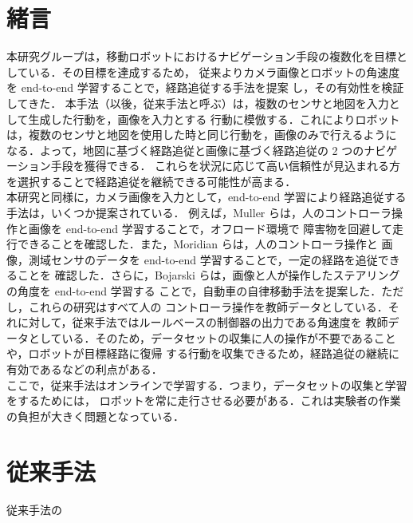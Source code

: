 \documentclass{jarticle}
\begin{document}
\date{} %

\maketitle
\thispagestyle{empty}
\pagestyle{empty}

\small
\section{緒言\protect\\}
本研究グループは，移動ロボットにおけるナビゲーション手段の複数化を目標としている．その目標を達成するため，
従来よりカメラ画像とロボットの角速度を end-to-end 学習することで，経路追従する手法を提案
し，その有効性を検証してきた\cite{okada}\cite{okada2}\cite{kiyooka}．
本手法（以後，従来手法と呼ぶ）は，複数のセンサと地図を入力として生成した行動を，画像を入力とする
行動に模倣する．これによりロボットは，複数のセンサと地図を使用した時と同じ行動を，画像のみで行えるように
なる．よって，地図に基づく経路追従と画像に基づく経路追従の 2 つのナビゲーション手段を獲得できる．
これらを状況に応じて高い信頼性が見込まれる方を選択することで経路追従を継続できる可能性が高まる．\\
\hspace*{1zw}本研究と同様に，カメラ画像を入力として，end-to-end 学習により経路追従する手法は，いくつか提案されている．
例えば，Muller らは，人のコントローラ操作と画像を end-to-end 学習することで，オフロード環境で
障害物を回避して走行できることを確認した\cite{off_load}．また，Moridian らは，人のコントローラ操作と
画像，測域センサのデータを end-to-end 学習することで，一定の経路を追従できることを
確認した\cite{Moridian}．さらに，Bojarski らは，画像と人が操作したステアリングの角度を end-to-end 学習する
ことで，自動車の自律移動手法を提案した\cite{Bojarski}．ただし，これらの研究はすべて人の
コントローラ操作を教師データとしている．それに対して，従来手法ではルールベースの制御器の出力である角速度を
教師データとしている．そのため，データセットの収集に人の操作が不要であることや，ロボットが目標経路に復帰
する行動を収集できるため，経路追従の継続に有効である\cite{imai}などの利点がある．\\
\hspace*{1zw}ここで，従来手法はオンラインで学習する．つまり，データセットの収集と学習をするためには，
ロボットを常に走行させる必要がある．これは実験者の作業の負担が大きく問題となっている．


\section{従来手法\protect\\}
従来手法の\\
\end{document}
